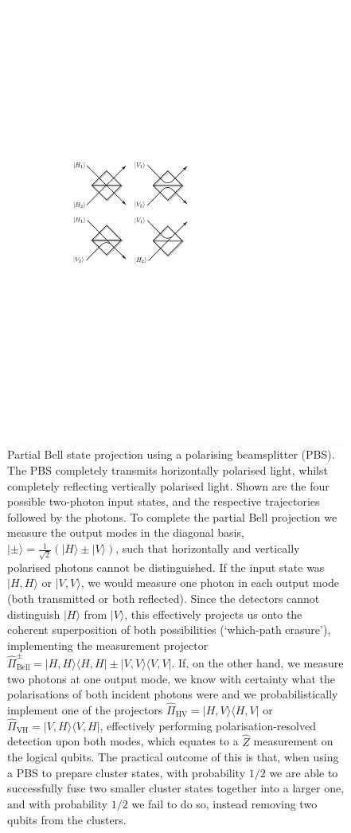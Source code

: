 \documentclass[aps,rmp,twocolumn,amsmath,amssymb,nofootinbib,superscriptaddress,longbibliography,floatfix,table-of-contents,eqsecnum]{revtex4-1}
\newcommand{\bra}[1]{\langle#1|}
\newcommand{\ket}[1]{|#1\rangle}
\begin{document}
\begin{figure}[!htb]
\includegraphics[width=0.75\columnwidth]{partial_bell}
\caption{Partial Bell state projection using a polarising beamsplitter (PBS). The PBS completely transmits horizontally polarised light, whilst completely reflecting vertically polarised light. Shown are the four possible two-photon input states, and the respective trajectories followed by the photons. To complete the partial Bell projection we measure the output modes in the diagonal basis, \mbox{$\ket{\pm} = \frac{1}{\sqrt{2}}(\ket{H}\pm\ket{V})$}, such that horizontally and vertically polarised photons cannot be distinguished. If the input state was $\ket{H,H}$ or $\ket{V,V}$, we would measure one photon in each output mode (both transmitted or both reflected). Since the detectors cannot distinguish $\ket{H}$ from $\ket{V}$, this effectively projects us onto the coherent superposition of both possibilities (`which-path erasure'), implementing the measurement projector \mbox{$\hat\Pi_\text{Bell}^\pm = \ket{H,H}\bra{H,H}\pm\ket{V,V}\bra{V,V}$}. If, on the other hand, we measure two photons at one output mode, we know with certainty what the polarisations of both incident photons were and we probabilistically implement one of the projectors \mbox{$\hat\Pi_
\text{HV}=\ket{H,V}\bra{H,V}$} or \mbox{$\hat\Pi_
\text{VH}=\ket{V,H}\bra{V,H}$}, effectively performing polarisation-resolved detection upon both modes, which equates to a $\hat{Z}$ measurement on the logical qubits. The practical outcome of this is that, when using a PBS to prepare cluster states, with probability $1/2$ we are able to successfully fuse two smaller cluster states together into a larger one, and with probability $1/2$ we fail to do so, instead removing two qubits from the clusters.} \label{fig:partial_bell}
\end{figure}
\end{document}
